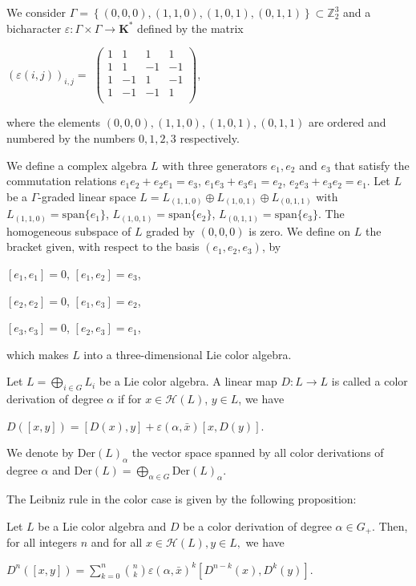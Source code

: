 \documentclass[11pt, twoside]{article}
\begin{document}
\begin{ex} \label{Example1}
We consider 
    $\Gamma= \left\{(0,0,0),(1,1,0), (1,0,1), (0,1,1) \right\} \subset\mathbb{Z}_2^3 $ 
   and a  bicharacter $\varepsilon:\Gamma\times \Gamma\to \mathbf{K}^* $ defined by the matrix \begin{center}
       $(\varepsilon(i,j))_{i,j} =$ $ \begin{pmatrix}
1 & 1 & 1 & 1 \\       
1 & 1 & -1 &  -1 \\
1 & -1 & 1 & -1 \\
1 & -1 &  -1& 1  \\
\end{pmatrix}$,
    \end{center} where the elements $(0,0,0), (1,1,0), (1,0,1), (0,1,1) $ are ordered and numbered by the numbers $ 0,1,2,3$ respectively.

    We define a complex algebra $L$ with three generators $e_1,e_2$ and $e_3$ that satisfy the commutation relations $e_1e_2+e_2e_1= e_3 $, $e_1e_3+e_3e_1= e_2 $, $e_2e_3+e_3e_2=e_1 $. Let $L$ be a $\Gamma $-graded linear space $L= L_{(1,1,0)}\oplus L_{(1,0,1)} \oplus L_{(0,1,1)} $ with  $ L_{(1,1,0)}=\mathrm{span}\{e_1\} $, $L_{(1,0,1)}=\mathrm{span}\{e_2\} $, $L_{(0,1,1)}=\mathrm{span}\{e_3\} $. The homogeneous subspace of $L$ graded by $(0,0,0) $ is zero. We define on $L$ the bracket given, with respect to the basis $(e_1,e_2,e_3)$, by   \begin{center}
        $[e_1,e_1]=0 $, $[e_1,e_2]=e_3 $,

        $[e_2,e_2]=0 $, $[e_1,e_3]=e_2 $,

        $[e_3,e_3]=0 $, $[e_2,e_3]= e_1 $,
    \end{center} which makes $L$ into a three-dimensional Lie color algebra.
\end{ex}

\begin{defi}
    Let $L= \bigoplus\limits_{i\in G}L_i $ be a Lie color algebra. A linear map $D:L\to L$ is called a color derivation of degree $\alpha$ if for $x \in \mathcal{H}(L)$, $y\in L $, we have \begin{center}
        $D([x,y])= [D(x),y]+ \varepsilon(\alpha,\bar{x})[x,D(y)] $.
    \end{center} We denote by $\mathrm{Der}(L)_{\alpha} $ the vector space spanned by all color derivations of degree $\alpha $ and $\mathrm{Der}(L)= \bigoplus\limits_{\alpha\in G}\mathrm{Der}(L)_\alpha $.
\end{defi}
The Leibniz rule in the color case is  given by the following proposition:
\begin{prop}
    Let $L$ be a Lie color algebra and $D$ be a color derivation of degree $\alpha\in G_+$. Then, for all integers $n$ and  for all $x\in \mathcal{H}(L), y\in L ,$ we have \begin{center}
        $D^n([x,y])=\sum\limits_{k=0}^n \binom{n}{k}\varepsilon(\alpha,\bar{x})^k [D^{n-k}(x),D^k(y)] $.
    \end{center}
\end{prop}
\end{document}
